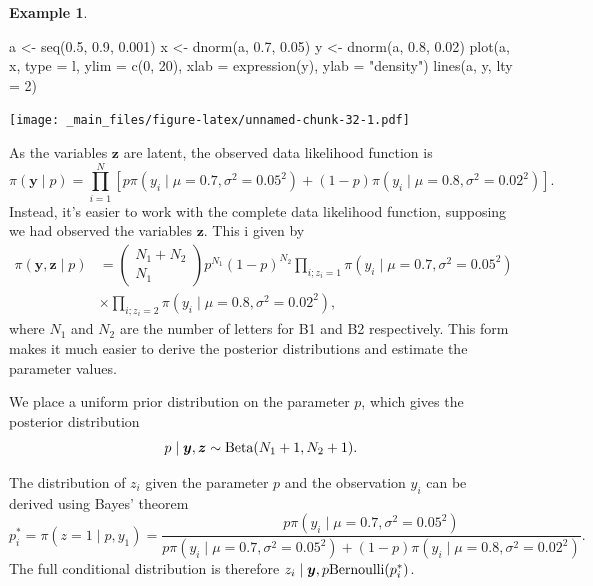 \documentclass[
]{book}
\newenvironment{Shaded}{\begin{snugshade}}{\end{snugshade}}
\newcommand{\AttributeTok}[1]{\textcolor[rgb]{0.77,0.63,0.00}{#1}}
\newcommand{\DecValTok}[1]{\textcolor[rgb]{0.00,0.00,0.81}{#1}}
\newcommand{\FloatTok}[1]{\textcolor[rgb]{0.00,0.00,0.81}{#1}}
\newcommand{\FunctionTok}[1]{\textcolor[rgb]{0.00,0.00,0.00}{#1}}
\newcommand{\NormalTok}[1]{#1}
\newcommand{\OtherTok}[1]{\textcolor[rgb]{0.56,0.35,0.01}{#1}}
\newcommand{\StringTok}[1]{\textcolor[rgb]{0.31,0.60,0.02}{#1}}
\theoremstyle{definition}
\theoremstyle{definition}
\newtheorem{example}{Example}[chapter]
\theoremstyle{definition}
\theoremstyle{definition}
\theoremstyle{remark}
\begin{document}
\begin{example}
\begin{Shaded}
\begin{Highlighting}[]
\NormalTok{a }\OtherTok{\textless{}{-}} \FunctionTok{seq}\NormalTok{(}\FloatTok{0.5}\NormalTok{, }\FloatTok{0.9}\NormalTok{, }\FloatTok{0.001}\NormalTok{)}
\NormalTok{x }\OtherTok{\textless{}{-}} \FunctionTok{dnorm}\NormalTok{(a, }\FloatTok{0.7}\NormalTok{, }\FloatTok{0.05}\NormalTok{)}
\NormalTok{y }\OtherTok{\textless{}{-}} \FunctionTok{dnorm}\NormalTok{(a, }\FloatTok{0.8}\NormalTok{, }\FloatTok{0.02}\NormalTok{)}
\FunctionTok{plot}\NormalTok{(a, x, }\AttributeTok{type =} \StringTok{\textquotesingle{}l\textquotesingle{}}\NormalTok{, }\AttributeTok{ylim =} \FunctionTok{c}\NormalTok{(}\DecValTok{0}\NormalTok{, }\DecValTok{20}\NormalTok{), }\AttributeTok{xlab =} \FunctionTok{expression}\NormalTok{(y), }\AttributeTok{ylab =} \StringTok{"density"}\NormalTok{)}
\FunctionTok{lines}\NormalTok{(a, y, }\AttributeTok{lty =} \DecValTok{2}\NormalTok{)}
\end{Highlighting}
\end{Shaded}

\texttt{[image: \_main\_files/figure-latex/unnamed-chunk-32-1.pdf]}

As the variables \(\boldsymbol{z}\) are latent, the observed data likelihood function is
\[
\pi(\boldsymbol{y} \mid  p) =\prod_{i=1}^N \left[ p\pi(y_i \mid \mu = 0.7, \sigma^2 = 0.05^2) + (1-p)\pi(y_i \mid \mu = 0.8, \sigma^2 = 0.02^2)\right].
\]
Instead, it's easier to work with the complete data likelihood function, supposing we had observed the variables \(\boldsymbol{z}\). This i given by
\begin{align*}
\pi(\boldsymbol{y}, \boldsymbol{z} \mid  p) &= \begin{pmatrix} N_1 + N_2
\\ N_1\end{pmatrix}p^{N_1}(1-p)^{N_2} \prod_{i; z_i = 1}\pi(y_i \mid \mu = 0.7, \sigma^2 = 0.05^2)  \\
&\times\prod_{i; z_i = 2}\pi(y_i \mid \mu = 0.8, \sigma^2 = 0.02^2),
\end{align*}
where \(N_1\) and \(N_2\) are the number of letters for B1 and B2 respectively. This form makes it much easier to derive the posterior distributions and estimate the parameter values.

We place a uniform prior distribution on the parameter \(p\), which gives the posterior distribution
\[
p \mid \boldsymbol{y}, \boldsymbol{z} \sim \hbox{Beta}(N_1 + 1, N_2 + 1).
\]

The distribution of \(z_i\) given the parameter \(p\) and the observation \(y_i\) can be derived using Bayes' theorem
\[
p^*_i = \pi(z = 1 \mid p, y_1) = \frac{p\pi(y_i \mid \mu = 0.7, \sigma^2 = 0.05^2)}{p\pi(y_i \mid \mu = 0.7, \sigma^2 = 0.05^2) + (1-p)\pi(y_i \mid \mu = 0.8, \sigma^2 = 0.02^2)}.
\]
The full conditional distribution is therefore \(z_i \mid \boldsymbol{y}, p \hbox{Bernoulli}(p^*_i)\).


\end{example}
\end{document}

